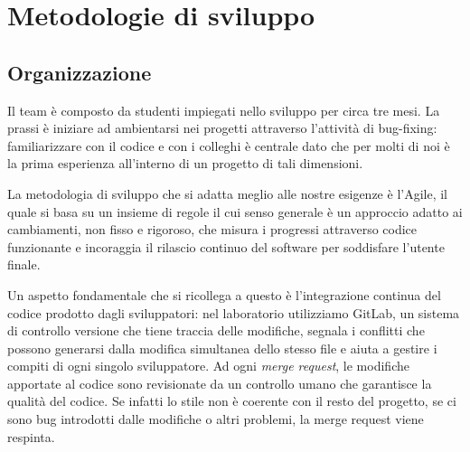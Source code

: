 \documentclass[Lau, oneside, noexaminfo]{sapthesis}%
\begin{document}
\chapter{Metodologie di sviluppo}
\label{ch:2}

\section{Organizzazione}
\label{sec:team}
Il team è composto da studenti impiegati nello sviluppo per circa tre mesi. La prassi è iniziare ad ambientarsi nei progetti attraverso l'attività di bug-fixing: familiarizzare con il codice e con i colleghi è centrale dato che per molti di noi è la prima esperienza all'interno di un progetto di tali dimensioni.

La metodologia di sviluppo che si adatta meglio alle nostre esigenze è l'Agile, il quale si basa su un insieme di regole il cui senso generale è un approccio adatto ai cambiamenti, non fisso e rigoroso, che misura i progressi attraverso codice funzionante e incoraggia il rilascio continuo del software per soddisfare l'utente finale. 

Un aspetto fondamentale che si ricollega a questo è l'integrazione continua del codice prodotto dagli sviluppatori: nel laboratorio utilizziamo GitLab, un sistema di controllo versione che tiene traccia delle modifiche, segnala i conflitti che possono generarsi dalla modifica simultanea dello stesso file e aiuta a gestire i compiti di ogni singolo sviluppatore.
Ad ogni \textit{merge request}, le modifiche apportate al codice sono revisionate da un controllo umano che garantisce la qualità del codice. Se infatti lo stile non è coerente con il resto del progetto, se ci sono bug introdotti dalle modifiche o altri problemi, la merge request viene respinta.
\end{document}
